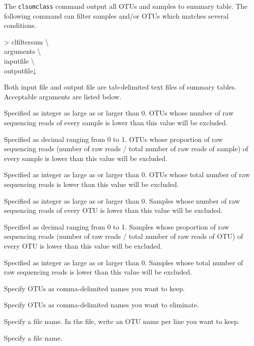 \documentclass[titlepage,10pt,a4paper,english]{jsbook}
\newenvironment{cmd}{\begin{oframed}\raggedright\ttfamily\footnotesize\setlength{\baselineskip}{1.4em}}{\end{oframed}\vspace{-1em}}
\begin{document}
The \texttt{clsumclass} command output all OTUs and samples to summary table.
The following command can filter samples and/or OTUs which matches several conditions.
\begin{cmd}
{\textgreater} clfiltersum {\textbackslash}\\
arguments {\textbackslash}\\
inputfile {\textbackslash}\\
outputfile↓
\end{cmd}
Both input file and output file are tab-delimited text files of summary tables.
Acceptable arguments are listed below.
\begin{description}\small\setlength{\baselineskip}{1.1em}
\item[\texttt{{-}{-}minnseqotu}] Specified as integer as large as or larger than 0.
OTUs whose number of raw sequencing reads of every sample is lower than this value will be excluded.
\item[\texttt{{-}{-}minpseqotu}] Specified as decimal ranging from 0 to 1.
OTUs whose proportion of raw sequencing reads (number of raw reads / total number of raw reads of sample) of every sample is lower than this value will be excluded.
\item[\texttt{{-}{-}minntotalseqotu}] Specified as integer as large as or larger than 0.
OTUs whose total number of raw sequencing reads is lower than this value will be excluded.
\item[\texttt{{-}{-}minnseqsample}] Specified as integer as large as or larger than 0.
Samples whose number of raw sequencing reads of every OTU is lower than this value will be excluded.
\item[\texttt{{-}{-}minpseqsample}] Specified as decimal ranging from 0 to 1.
Samples whose proportion of raw sequencing reads (number of raw reads / total number of raw reads of OTU) of every OTU is lower than this value will be excluded.
\item[\texttt{{-}{-}minntotalseqsample}] Specified as integer as large as or larger than 0.
Samples whose total number of raw sequencing reads is lower than this value will be excluded.
\item[\texttt{{-}{-}otu}] Specify OTUs as comma-delimited names you want to keep.
\item[\texttt{{-}{-}negativeotu}] Specify OTUs as comma-delimited names you want to eliminate.
\item[\texttt{{-}{-}otulist}] Specify a file name.
In the file, write an OTU name per line you want to keep.
\item[\texttt{{-}{-}negativeotulist}] Specify a file name.

\end{description}
\end{document}

